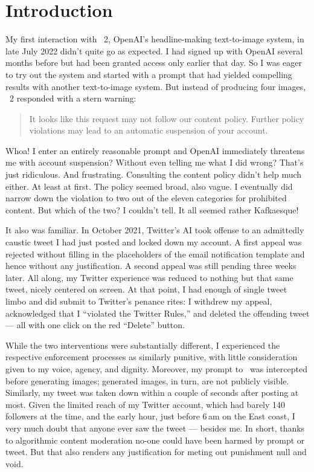 
\section{Introduction}
\label{sec:introduction}

My first interaction with \dalle~2, OpenAI's headline-making text-to-image
system, in late July 2022 didn't quite go as expected. I had signed up with
OpenAI several months before but had been granted access only earlier that day.
So I was eager to try out the system and started with a prompt that had yielded
compelling results with another text-to-image system. But instead of producing
four images, \dalle~2 responded with a stern warning:

\begin{quote}
\openfatdquo{}It looks like this request may not follow our content policy.
Further policy violations may lead to an automatic suspension of your
account.\closefatdquo{}
\end{quote}

\noindent Whoa! I enter an entirely reasonable prompt and OpenAI immediately
threatens me with account suspension? Without even telling me what I did wrong?
That's just ridiculous. And frustrating. Consulting the content policy didn't
help much either. At least at first. The policy seemed broad, also vague. I
eventually did narrow down the violation to two out of the eleven categories for
prohibited content. But which of the two? I couldn't tell. It all seemed rather
Kafkaesque!

It also was familiar. In October 2021, Twitter's AI took offense to an
admittedly caustic tweet I had just posted and locked down my account. A first
appeal was rejected without filling in the placeholders of the email
notification template and hence without any justification. A second appeal was
still pending three weeks later. All along, my Twitter experience was reduced to
nothing but that same tweet, nicely centered on screen. At that point, I had
enough of single tweet limbo and did submit to Twitter's penance rites: I
withdrew my appeal, acknowledged that I ``violated the Twitter Rules,'' and
deleted the offending tweet --- all with one click on the red ``Delete'' button.

While the two interventions were substantially different, I experienced the
respective enforcement processes as similarly punitive, with little
consideration given to my voice, agency, and dignity. Moreover, my prompt to
\dalle\ was intercepted before generating images; generated images, in turn, are
not publicly visible. Similarly, my tweet was taken down within a couple of
seconds after posting at most. Given the limited reach of my Twitter account,
which had barely 140 followers at the time, and the early hour, just before
6$\,$am on the East coast, I very much doubt that anyone ever saw the tweet ---
besides me. In short, thanks to algorithmic content moderation no-one could have
been harmed by prompt or tweet. But that also renders any justification for
meting out punishment null and void.

